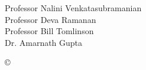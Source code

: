 




\othercommitteemembers
{
  Professor Nalini Venkatasubramanian\\
  Professor Deva Ramanan\\
  Professor Bill Tomlinson\\
  Dr. Amarnath Gupta
}


\copyrightdeclaration
{
  {\copyright} {\Degreeyear} \Authorname
}


\dedications
{
}

\acknowledgments
{
%  
%  
%  
}


